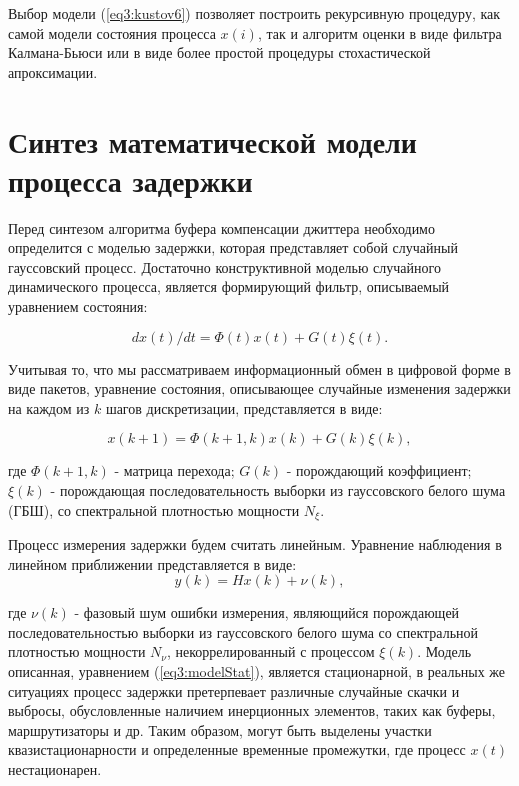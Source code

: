 Выбор модели (\ref{eq3:kustov6}) позволяет построить рекурсивную процедуру, как самой модели состояния процесса $x(i)$, так и алгоритм оценки в виде фильтра Калмана-Бьюси или в виде более простой процедуры стохастической апроксимации.



\section{Синтез математической модели процесса задержки} \label{sect3_1}
Перед синтезом алгоритма буфера компенсации джиттера необходимо определится с моделью задержки, которая представляет собой случайный гауссовский процесс. Достаточно конструктивной моделью случайного динамического процесса, является формирующий фильтр, описываемый уравнением состояния:

\begin{equation}\label{eq3:modelStatDif}
dx(t)/dt=\Phi(t)x(t)+G(t)\xi(t).
\end{equation}

Учитывая то, что мы рассматриваем информационный обмен в цифровой форме в виде пакетов, уравнение состояния, описывающее случайные изменения задержки на каждом из $k$ шагов дискретизации, представляется в виде:

\begin{equation}\label{eq3:modelStat}
x(k+1)=\Phi(k+1,k)x(k)+G(k)\xi(k),
\end{equation}

\noindent где $\Phi(k+1,k)$ - матрица перехода; $G(k)$ - порождающий коэффициент; $\xi(k)$ - порождающая последовательность выборки из гауссовского белого шума (ГБШ), со спектральной плотностью мощности $N_\xi$.

Процесс измерения задержки будем считать линейным. Уравнение наблюдения в линейном приближении представляется в виде:
\begin{equation}\label{eq3:Estim}
y(k)=Hx(k)+\nu(k),
\end{equation}

\noindent где $\nu(k)$ - фазовый шум ошибки измерения, являющийся порождающей последовательностью выборки из гауссовского белого шума со спектральной плотностью мощности $N_\nu$, некоррелированный с процессом $\xi(k)$. 
Модель описанная, уравнением (\ref{eq3:modelStat}), является стационарной, в реальных же ситуациях процесс задержки претерпевает различные случайные скачки и выбросы, обусловленные наличием инерционных элементов, таких как буферы, маршрутизаторы и др. Таким образом, могут быть выделены участки квазистационарности и определенные временные промежутки, где процесс $x(t)$ нестационарен.

